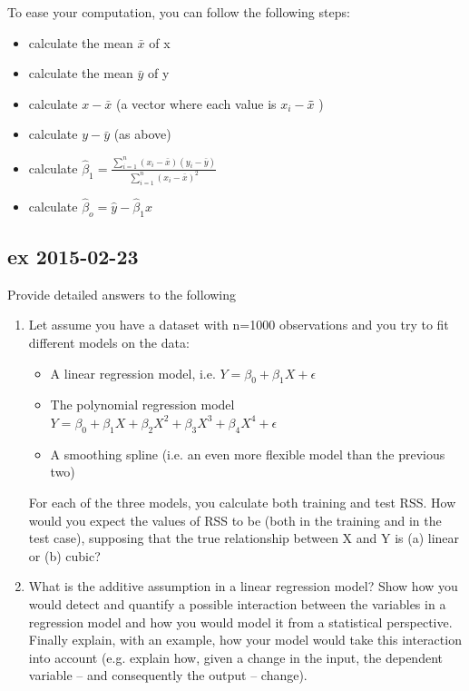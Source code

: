 \documentclass[a4paper,12pt,titlepage]{article} %
\begin{document}
To ease your computation, you can follow the following steps:
\begin{itemize}
\item calculate the mean $\bar{x}$ of x
\item calculate the mean $\bar{y}$ of y
\item calculate $ x - \bar{x} $ (a vector where each value is $ x_{i} - \bar{x} $̄ )
\item calculate $ y - \bar{y} $ (as above)
\item calculate $ \hat{\beta}_{1} = \frac{\sum_{i=1}^{n} (x_{i}-\bar{x}) (y_{i}-\bar{y})}{ \sum_{i=1}^{n} (x_{i}-\bar{x})^{2} } $
\item calculate $ \hat{\beta}_{o} = \hat{y} - \hat{\beta}_{1} x $
\end{itemize}

\subsection{ex 2015-02-23}
Provide detailed answers to the following
\begin{enumerate}
\item Let assume you have a dataset with n=1000 observations and you try to fit different
  models on the data:
  \begin{itemize}
\item A linear regression model, i.e. $ Y = \beta_{0} + \beta_{1} X + \epsilon $
\item The polynomial regression model $ Y = \beta_{0} + \beta_{1} X + \beta_{2} X^{2} + \beta_{3} X^{3} + \beta_{4} X^{4} +  \epsilon $
\item A smoothing spline (i.e. an even more flexible model than the previous two)
  \end{itemize}
 For each of the three models, you calculate both training and test RSS. How would you expect the values of RSS to be (both in the training and in the test case), supposing that the true relationship between X and Y is (a) linear or (b) cubic?
\item What is the additive assumption in a linear regression model? Show how you would detect and quantify a possible interaction between the variables in a regression model and how you would model it from a statistical perspective. Finally explain, with an example, how your model would take this interaction into account (e.g. explain how, given a change in the input, the dependent variable – and consequently the output – change).
\end{enumerate}
\end{document}
